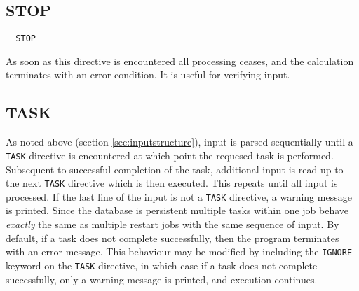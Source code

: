 \subsection{STOP}

\begin{verbatim}
  STOP
\end{verbatim}

As soon as this directive is encountered all processing ceases, and
the calculation terminates with an error condition.  It is useful for
verifying input.

\subsection{TASK}
\label{sec:task}

As noted above (section \ref{sec:inputstructure}), input is parsed
sequentially until a \verb+TASK+ directive is encountered at which
point the requesed task is performed.  Subsequent to successful
completion of the task, additional input is read up to the next
\verb+TASK+ directive which is then executed.  This repeats until all
input is processed.  If the last line of the input is not a
\verb+TASK+ directive, a warning message is printed.  Since the
database is persistent multiple tasks within one job behave {\em
  exactly} the same as multiple restart jobs with the same sequence of
input.  By default, if a task does not complete successfully, then
the program terminates with an error message.  This behaviour may
be modified by including the \verb+IGNORE+ keyword on the \verb+TASK+
directive, in which case if a task does not complete successfully, 
only a warning message is printed, and execution continues.

